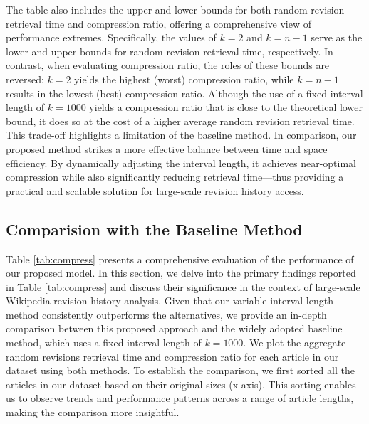 \documentclass[acmsmall]{acmart}
\begin{document}
The table also includes the upper and lower bounds for both random revision retrieval time and compression ratio, offering a comprehensive view of performance extremes. Specifically, the values of $k = 2$ and $k = n-1$ serve as the lower and upper bounds for random revision retrieval time, respectively. In contrast, when evaluating compression ratio, the roles of these bounds are reversed: $k = 2$ yields the highest (worst) compression ratio, while $k = n-1$ results in the lowest (best) compression ratio. Although the use of a fixed interval length of $k = 1000$ yields a compression ratio that is close to the theoretical lower bound, it does so at the cost of a higher average random revision retrieval time. This trade-off highlights a limitation of the baseline method. In comparison, our proposed method strikes a more effective balance between time and space efficiency. By dynamically adjusting the interval length, it achieves near-optimal compression while also significantly reducing retrieval time—thus providing a practical and scalable solution for large-scale revision history access.


\subsection{Comparision with the Baseline Method}
Table \ref{tab:compress} presents a comprehensive evaluation of the performance of our proposed model. In this section, we delve into the primary findings reported in Table \ref{tab:compress} and discuss their significance in the context of large-scale Wikipedia revision history analysis. Given that our variable-interval length method consistently outperforms the alternatives, we provide an in-depth comparison between this proposed approach and the widely adopted baseline method, which uses a fixed interval length of $k=1000$. We plot the aggregate random revisions retrieval time and compression ratio for each article in our dataset using both methods. To establish the comparison, we first sorted all the articles in our dataset based on their original sizes (x-axis). This sorting enables us to observe trends and performance patterns across a range of article lengths, making the comparison more insightful.
 
\end{document}
